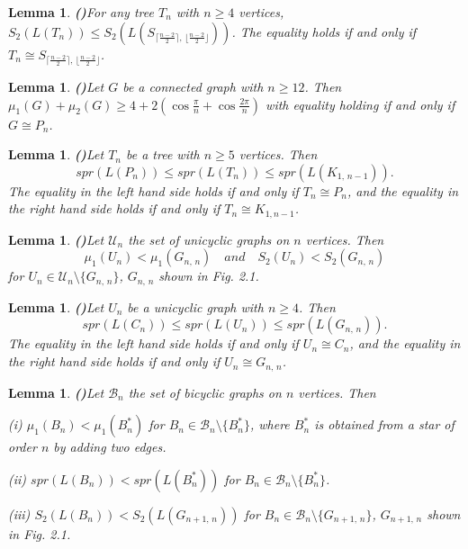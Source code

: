 \documentclass[12pt, a4paper]{article}
\newtheorem{lemma}[theorem]{Lemma}
\begin{document}
\begin{lemma}{\bf (\cite{GZW})}\label{le2,7} %
For any tree $T_n$ with $n\geq 4$ vertices, $S_2(L(T_n))\leq S_2(L(S_{\lceil\frac{n-2}{2}\rceil, \, \lfloor\frac{n-2}{2}\rfloor}))$. The equality holds
if and only if $T_n\cong S_{\lceil\frac{n-2}{2}\rceil, \, \lfloor\frac{n-2}{2}\rfloor}$.
\end{lemma}



\begin{lemma}{\bf (\cite{LHS})}\label{le2,8} %
Let $G$ be a connected graph with $n\geq 12$. Then $\mu_1(G)+\mu_2(G)\geq 4+2\left(\cos\frac{\pi}{n}+\cos\frac{2\pi}{n}\right)$ with equality holding if and only if $G\cong P_n$.
\end{lemma}

\begin{lemma}{\bf (\cite{FXWL})}\label{le2,9} %
Let $T_n$ be a tree with $n\geq 5$ vertices. Then
$$spr(L(P_n))\leq spr(L(T_n))\leq spr(L(K_{1,\, n-1})).$$
The equality in the left hand side holds if and only if $T_n\cong P_n$, and the equality in the right hand side holds if and only if $T_n\cong K_{1,n-1}$.
\end{lemma}


\begin{lemma}{\bf (\cite{G, ZCL})}\label{le2,10} %
Let $\mathcal{U}_n$ the set of unicyclic graphs on $n$ vertices. Then
$$\mu_1(U_n)< \mu_1(G_{n,\,n}) \quad and \quad S_2(U_n)< S_2(G_{n,\,n})$$
for $U_n\in \mathcal{U}_n\setminus \{G_{n,\,n}\}$, $G_{n,\,n}$ shown in Fig. 2.1.
\end{lemma}


\begin{lemma}{\bf (\cite{BTF, YL})}\label{le2,11} %
Let $U_n$ be a unicyclic graph with $n\geq 4$. Then
$$spr(L(C_n))\leq spr(L(U_n))\leq spr(L(G_{n,\, n})).$$
The equality in the left hand side holds if and only if $U_n\cong C_n$, and the equality in the right hand side holds if and only if $U_n\cong G_{n,\, n}$.
\end{lemma}

\begin{lemma}{\bf (\cite{FLT, HSH, ZCLR})}\label{le2,12} %
Let $\mathcal{B}_n$ the set of bicyclic graphs on $n$ vertices. Then

{\normalfont (i)} $\mu_1(B_n)< \mu_1(B_n^{*})$ for $B_n\in \mathcal{B}_n\setminus \{B_n^{*}\}$, where $B_n^{*}$ is obtained from a star of order $n$ by adding two edges.

{\normalfont (ii)} $spr(L(B_n))<  spr(L(B_n^{*}))$ for $B_n\in \mathcal{B}_n\setminus \{B_n^{*}\}$.

{\normalfont (iii)} $S_2(L(B_n))< S_2(L(G_{n+1,\,n}))$
for $B_n\in \mathcal{B}_n\setminus \{G_{n+1,\,n}\}$, $G_{n+1,\,n}$ shown in Fig. 2.1.
\end{lemma}
\end{document}
